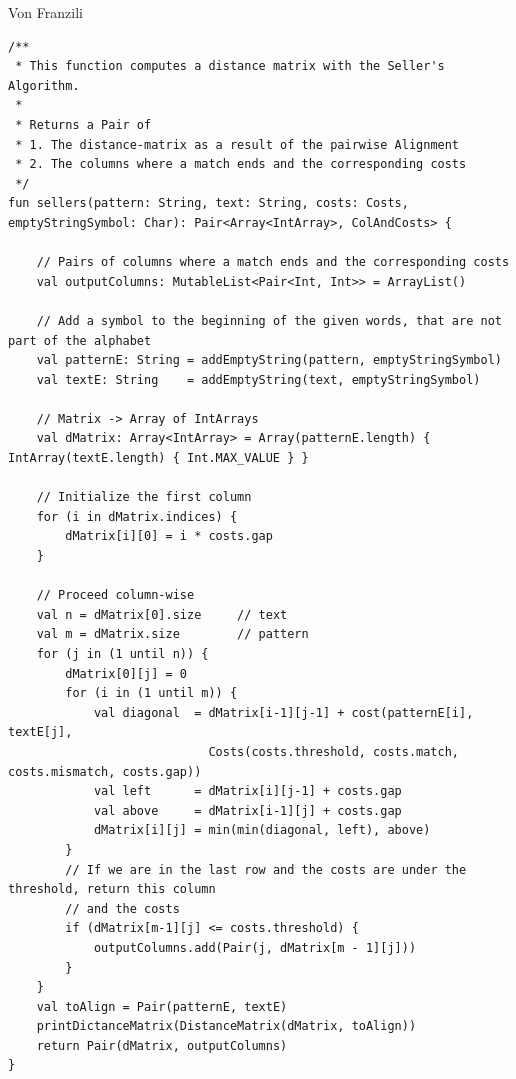 \begin{bsp}
    Von Franzili~\cite{franzili2026_sellers} \scriptsize
    \begin{verbatim}
/**
 * This function computes a distance matrix with the Seller's Algorithm.
 *
 * Returns a Pair of
 * 1. The distance-matrix as a result of the pairwise Alignment
 * 2. The columns where a match ends and the corresponding costs
 */
fun sellers(pattern: String, text: String, costs: Costs, emptyStringSymbol: Char): Pair<Array<IntArray>, ColAndCosts> {

    // Pairs of columns where a match ends and the corresponding costs
    val outputColumns: MutableList<Pair<Int, Int>> = ArrayList()

    // Add a symbol to the beginning of the given words, that are not part of the alphabet
    val patternE: String = addEmptyString(pattern, emptyStringSymbol)
    val textE: String    = addEmptyString(text, emptyStringSymbol)

    // Matrix -> Array of IntArrays
    val dMatrix: Array<IntArray> = Array(patternE.length) { IntArray(textE.length) { Int.MAX_VALUE } }

    // Initialize the first column
    for (i in dMatrix.indices) {
        dMatrix[i][0] = i * costs.gap
    }

    // Proceed column-wise
    val n = dMatrix[0].size     // text
    val m = dMatrix.size        // pattern
    for (j in (1 until n)) {
        dMatrix[0][j] = 0
        for (i in (1 until m)) {
            val diagonal  = dMatrix[i-1][j-1] + cost(patternE[i], textE[j],
                            Costs(costs.threshold, costs.match, costs.mismatch, costs.gap))
            val left      = dMatrix[i][j-1] + costs.gap
            val above     = dMatrix[i-1][j] + costs.gap
            dMatrix[i][j] = min(min(diagonal, left), above)
        }
        // If we are in the last row and the costs are under the threshold, return this column
        // and the costs
        if (dMatrix[m-1][j] <= costs.threshold) {
            outputColumns.add(Pair(j, dMatrix[m - 1][j]))
        }
    }
    val toAlign = Pair(patternE, textE)
    printDictanceMatrix(DistanceMatrix(dMatrix, toAlign))
    return Pair(dMatrix, outputColumns)
}
    \end{verbatim}
\end{bsp}


